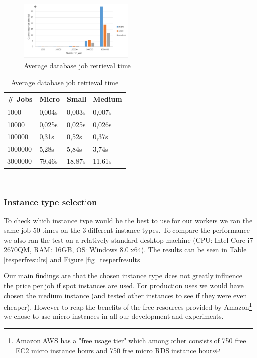 \documentclass[a4paper]{IEEEtran}
\begin{document}
\begin{figure}
\centering
\includegraphics[width=0.5\textwidth]{"results-database"}
\caption{Average database job retrieval time}
\label{fig_dbperfresults}
\end{figure}

\begin{table}
\caption{Average database job retrieval time}
\label{dbperfresults}
\centering
\begin{tabular}{| l | l | l | l |}
\hline
\# Jobs & Micro & Small & Medium \\ \hline
1000 & 0,004s &	0,003s & 0,007s \\ \hline
10000 & 0,025s & 0,025s & 0,026s \\ \hline
100000 & 0,31s & 0,52s & 0,37s \\ \hline
1000000 & 5,28s & 5,84s & 3,74s \\ \hline
3000000	& 79,46s & 18,87s & 11,61s \\ \hline
\end{tabular}
\end{table}
\ \\
\subsubsection{Instance type selection}

To check which instance type would be the best to use for our workers we ran the same job 50 times on the 3 different instance types. To compare the performance we also ran the test on a relatively standard desktop machine (CPU: Intel Core i7 2670QM, RAM: 16GB, OS: Windows 8.0 x64). The results can be seen in Table \ref{tesperfresults} and Figure \ref{fig_tesperfresults}

Our main findings are that the chosen instance type does not greatly influence the price per job if spot instances are used. For production uses we would have chosen the medium instance (and tested other instances to see if they were even cheaper). However to reap the benefits of the free resources provided by Amazon\footnote{Amazon AWS has a "free usage tier" which among other consists of 750 free EC2 micro instance hours and 750 free micro RDS instance hours} we chose to use micro instances in all our development and experiments.
\end{document}
